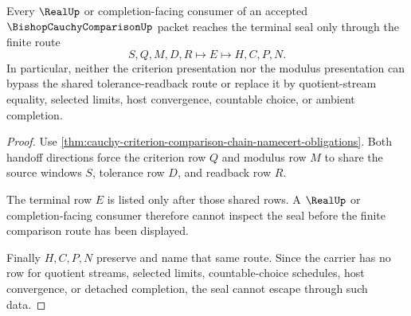 \begin{theorem}
\label{thm:cauchy-criterion-comparison-chain-real-seal-nonescape}
Every $\RealUp$ or completion-facing consumer of an accepted $\BishopCauchyComparisonUp$ packet reaches the terminal seal only through the finite route
$$
S,Q,M,D,R \longmapsto E \longmapsto H,C,P,N .
$$
In particular, neither the criterion presentation nor the modulus presentation can bypass the shared tolerance-readback route or replace it by quotient-stream equality, selected limits, host convergence, countable choice, or ambient completion.
\end{theorem}
\begin{proof}
Use \autoref{thm:cauchy-criterion-comparison-chain-namecert-obligations}. Both handoff directions force the criterion row $Q$ and modulus row $M$ to share the source windows $S$, tolerance row $D$, and readback row $R$.

The terminal row $E$ is listed only after those shared rows. A $\RealUp$ or completion-facing consumer therefore cannot inspect the seal before the finite comparison route has been displayed.

Finally $H,C,P,N$ preserve and name that same route. Since the carrier has no row for quotient streams, selected limits, countable-choice schedules, host convergence, or detached completion, the seal cannot escape through such data.
\end{proof}




